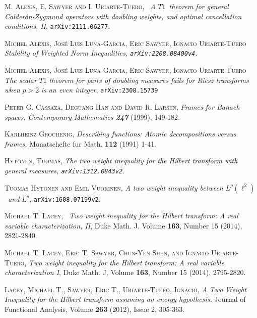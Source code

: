 \documentclass{amsart}%
\theoremstyle{plain}
\numberwithin{equation}{section}
\begin{document}
\begin{thebibliography}{999999999}

\textsc{M. Alexis, E. Sawyer and I. Uriarte-Tuero,}%
\textit{\ A }$T1$\textit{\ theorem for general Calder\'{o}n-Zygmund operators
with doubling weights, and optimal cancellation conditions, II},
\texttt{arXiv:2111.06277}.

\textsc{Michel Alexis, Jos\'{e} Luis Luna-Garcia,
Eric Sawyer, Ignacio Uriarte-Tuero }\textit{Stability of Weighted Norm
Inequalities, \texttt{arXiv:2208.08400v4}.}

\textsc{Michel Alexis, Jos\'{e} Luis
Luna-Garcia, Eric Sawyer, Ignacio Uriarte-Tuero }\textit{The scalar} $T1$
\textit{theorem for pairs of doubling measures fails for Riesz transforms
when} $p>2$ \textit{is an even integer}, \texttt{arXiv:2308.15739}

\textsc{Peter G. Cassaza, Deguang Han and David R.
Larsen, }\textit{Frames for Banach spaces, Contemporary Mathematics
\textbf{247} }(1999), 149-182.

\textsc{Karlheinz Grochenig, }\textit{Describing functions:
Atomic decompositions versus frames, }Monatschefte fur Math. \textbf{112}
(1991) 1-41.

\textsc{Hyt\"{o}nen, Tuomas, }\textit{The two weight
inequality for the Hilbert transform with general measures,
\texttt{arXiv:1312.0843v2}.}

\textsc{Tuomas Hyt\"{o}nen and Emil Vuorinen, }\textit{A
two weight inequality between }$L^{p}\left(  \ell^{2}\right)  $\textit{\ and
}$L^{p}$, \texttt{arXiv:1608.07199v2}.

\textsc{Michael T. Lacey, }\textit{\ Two weight inequality for the Hilbert transform: A real variable characterization, II}, Duke Math. J. Volume \textbf{163}, Number 15 (2014), 2821-2840.

\textsc{Michael T. Lacey, Eric T. Sawyer,
Chun-Yen Shen, and Ignacio Uriarte-Tuero,} \textit{Two weight inequality for
the Hilbert transform: A real variable characterization I}, Duke Math. J,
Volume \textbf{163}, Number 15 (2014), 2795-2820.

\textsc{Lacey, Michael T., Sawyer, Eric T.,
Uriarte-Tuero, Ignacio,} \textit{A Two Weight Inequality for the Hilbert
transform assuming an energy hypothesis, } Journal of Functional Analysis,
Volume \textbf{263} (2012), Issue 2, 305-363.


\end{thebibliography}
\end{document}
